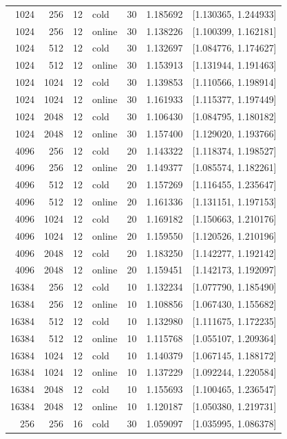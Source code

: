 \begin{longtable}{rrrlrrr}
1024 & 256 & 12 & cold & 30 & 1.185692 & [1.130365, 1.244933] \\
1024 & 256 & 12 & online & 30 & 1.138226 & [1.100399, 1.162181] \\
1024 & 512 & 12 & cold & 30 & 1.132697 & [1.084776, 1.174627] \\
1024 & 512 & 12 & online & 30 & 1.153913 & [1.131944, 1.191463] \\
1024 & 1024 & 12 & cold & 30 & 1.139853 & [1.110566, 1.198914] \\
1024 & 1024 & 12 & online & 30 & 1.161933 & [1.115377, 1.197449] \\
1024 & 2048 & 12 & cold & 30 & 1.106430 & [1.084795, 1.180182] \\
1024 & 2048 & 12 & online & 30 & 1.157400 & [1.129020, 1.193766] \\
4096 & 256 & 12 & cold & 20 & 1.143322 & [1.118374, 1.198527] \\
4096 & 256 & 12 & online & 20 & 1.149377 & [1.085574, 1.182261] \\
4096 & 512 & 12 & cold & 20 & 1.157269 & [1.116455, 1.235647] \\
4096 & 512 & 12 & online & 20 & 1.161336 & [1.131151, 1.197153] \\
4096 & 1024 & 12 & cold & 20 & 1.169182 & [1.150663, 1.210176] \\
4096 & 1024 & 12 & online & 20 & 1.159550 & [1.120526, 1.210196] \\
4096 & 2048 & 12 & cold & 20 & 1.183250 & [1.142277, 1.192142] \\
4096 & 2048 & 12 & online & 20 & 1.159451 & [1.142173, 1.192097] \\
16384 & 256 & 12 & cold & 10 & 1.132234 & [1.077790, 1.185490] \\
16384 & 256 & 12 & online & 10 & 1.108856 & [1.067430, 1.155682] \\
16384 & 512 & 12 & cold & 10 & 1.132980 & [1.111675, 1.172235] \\
16384 & 512 & 12 & online & 10 & 1.115768 & [1.055107, 1.209364] \\
16384 & 1024 & 12 & cold & 10 & 1.140379 & [1.067145, 1.188172] \\
16384 & 1024 & 12 & online & 10 & 1.137229 & [1.092244, 1.220584] \\
16384 & 2048 & 12 & cold & 10 & 1.155693 & [1.100465, 1.236547] \\
16384 & 2048 & 12 & online & 10 & 1.120187 & [1.050380, 1.219731] \\
256 & 256 & 16 & cold & 30 & 1.059097 & [1.035995, 1.086378] \\

\end{longtable}
